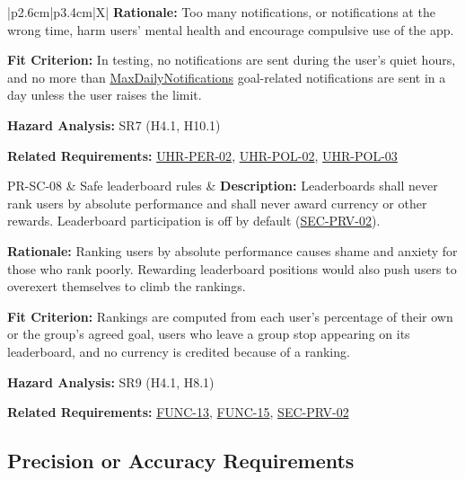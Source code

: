 \documentclass[12pt]{article}
\newcommand{\const}[1]{\hyperlink{const:#1}{\textsf{#1}}}
\begin{document}
\begin{xltabular}{\textwidth}{|p{2.6cm}|p{3.4cm}|X|}
\textbf{Rationale:} Too many notifications, or notifications at the wrong time, harm users' mental health and encourage compulsive use of the app.

\textbf{Fit Criterion:} In testing, no notifications are sent during the user's quiet hours, and no more than \const{MaxDailyNotifications} goal-related notifications are sent in a day unless the user raises the limit.

\textbf{Hazard Analysis:} SR7 (H4.1, H10.1)

\textbf{Related Requirements:} \hyperlink{req:UHR-PER-02}{UHR-PER-02}, \hyperlink{req:UHR-POL-02}{UHR-POL-02}, \hyperlink{req:UHR-POL-03}{UHR-POL-03}\\
\hline

PR-SC-08\hypertarget{req:PR-SC-08}{} &
Safe leaderboard rules &
\textbf{Description:} Leaderboards shall never rank users by absolute performance and shall never award currency or other rewards. Leaderboard participation is off by default (\hyperlink{req:SEC-PRV-02}{SEC-PRV-02}).

\textbf{Rationale:} Ranking users by absolute performance causes shame and anxiety for those who rank poorly. Rewarding leaderboard positions would also push users to overexert themselves to climb the rankings.

\textbf{Fit Criterion:} Rankings are computed from each user's percentage of their own or the group's agreed goal, users who leave a group stop appearing on its leaderboard, and no currency is credited because of a ranking.

\textbf{Hazard Analysis:} SR9 (H4.1, H8.1)

\textbf{Related Requirements:} \hyperlink{req:FUNC-13}{FUNC-13}, \hyperlink{req:FUNC-15}{FUNC-15}, \hyperlink{req:SEC-PRV-02}{SEC-PRV-02}\\
\hline

\end{xltabular}

\subsection{Precision or Accuracy Requirements}
\end{document}
